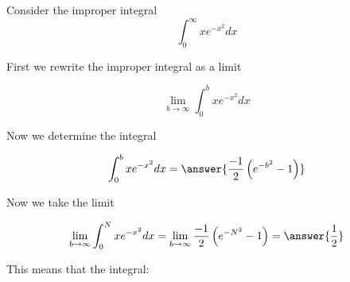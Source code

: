 \documentclass{ximera}
\author{Jason Miller}
\begin{document}
\begin{exercise}
Consider the improper integral 
\[
\int_{0}^{\infty} xe^{-x^{2}} dx 
\]


First we rewrite the improper integral as a limit

\[
\lim_{b\to \infty} \int_{0}^{b} xe^{-x^{2}} dx
\]

Now we determine the integral 

\[
\int_{0}^{b} xe^{-x^{2}} dx= \answer{ \frac{-1}{2}\left(e^{-b^{2}}-1 \right) }
\]

\begin{exercise}
Now we take the limit 

\[
\lim_{b \to \infty} \int_{0}^{N} xe^{-x^{2}} dx =\lim_{b \to \infty} \frac{-1}{2} \left( e^{-N^{2}}-1 \right) = 
\answer{ \frac{1}{2}} 
\]

\begin{exercise}
This means that the integral: 

\begin{multipleChoice}
\end{multipleChoice}

\end{exercise}
\end{exercise}
\end{exercise}
\end{document}
